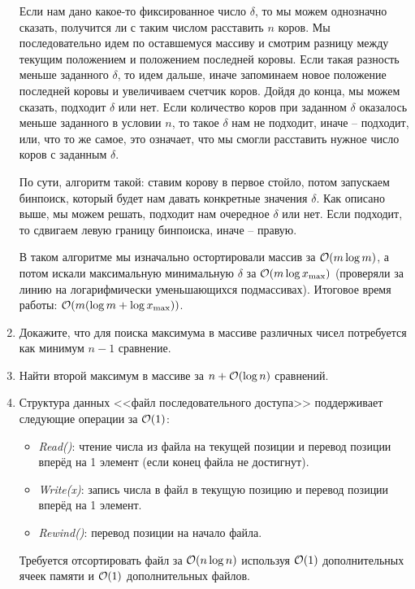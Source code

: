 \begin{enumerate}
\begin{solution}
		Если нам дано какое-то фиксированное число $\delta$, то мы можем однозначно сказать, получится ли с таким числом расставить $n$ коров. Мы последовательно идем по оставшемуся массиву и смотрим разницу между текущим положением и положением последней коровы. Если такая разность меньше заданного $\delta$, то идем дальше, иначе запоминаем новое положение последней коровы и увеличиваем счетчик коров. Дойдя до конца, мы можем сказать, подходит $\delta$ или нет. Если количество коров при заданном $\delta$ оказалось меньше заданного в условии $n$, то такое $\delta$ нам не подходит, иначе -- подходит, или, что то же самое, это означает, что мы смогли расставить нужное число коров с заданным $\delta$.

		По сути, алгоритм такой: ставим корову в первое стойло, потом запускаем бинпоиск, который будет нам давать конкретные значения $\delta$. Как описано выше, мы можем решать, подходит нам очередное $\delta$ или нет. Если подходит, то сдвигаем левую границу бинпоиска, иначе -- правую.

		В таком алгоритме мы изначально остортировали массив за $\mathcal{O}(m \log m)$, а потом искали максимальную минимальную $\delta$ за $\mathcal{O}(m \log{x_{\max}})$ (проверяли за линию на логарифмически уменьшающихся подмассивах). Итоговое время работы: $\mathcal{O}(m (\log{m} + \log{x_{\max}}))$.
	\end{solution}

  \item
    Докажите, что для поиска максимума в массиве различных чисел потребуется
	как минимум $n-1$ сравнение.

  \item
	Найти второй максимум в массиве за $n + \mathcal{O}(\log n)$ сравнений.	

  \item
	Структура данных <<файл последовательного доступа>>
	поддерживает следующие операции за $\mathcal{O}(1)$:
	\begin{itemize}
		\item \emph{Read()}: чтение числа из файла на текущей
		позиции и перевод позиции вперёд на 1 элемент (если конец файла не достигнут).
		\item \emph{Write(x)}: запись числа в файл в текущую
		позицию и перевод позиции вперёд на 1 элемент.
		\item \emph{Rewind()}: перевод позиции на начало файла.
	\end{itemize}

	Требуется отсортировать файл за $\mathcal{O}(n \log{n})$ используя
	$\mathcal{O}(1)$ дополнительных ячеек памяти и $\mathcal{O}(1)$ дополнительных файлов.


\end{enumerate}
